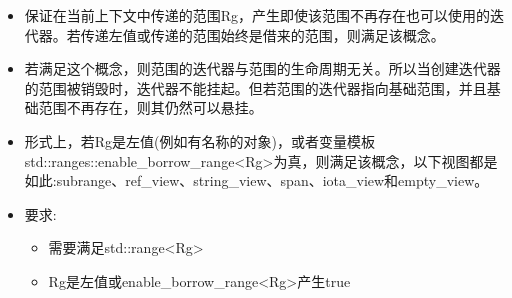 
\begin{itemize}
\item
保证在当前上下文中传递的范围Rg，产生即使该范围不再存在也可以使用的迭代器。若传递左值或传递的范围始终是借来的范围，则满足该概念。

\item
若满足这个概念，则范围的迭代器与范围的生命周期无关。所以当创建迭代器的范围被销毁时，迭代器不能挂起。但若范围的迭代器指向基础范围，并且基础范围不再存在，则其仍然可以悬挂。

\item
形式上，若Rg是左值(例如有名称的对象)，或者变量模板std::ranges::enable\_borrow\_range<Rg>为真，则满足该概念，以下视图都是如此:subrange、ref\_view、string\_view、span、iota\_view和empty\_view。

\item
要求:

\begin{itemize}
\item
需要满足std::range<Rg>

\item
Rg是左值或enable\_borrow\_range<Rg>产生true
\end{itemize}
\end{itemize}


